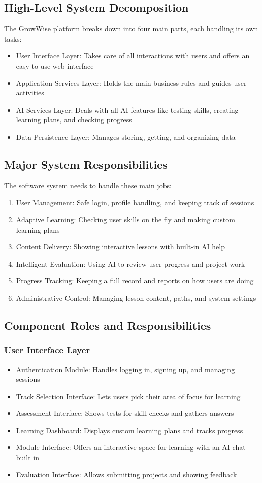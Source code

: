 \documentclass{FastFyp}
\begin{document}
\subsection{High-Level System Decomposition}
The GrowWise platform breaks down into four main parts, each handling its own tasks:
\begin{itemize}
    \item User Interface Layer: Takes care of all interactions with users and offers an easy-to-use web interface
    \item Application Services Layer: Holds the main business rules and guides user activities
    \item AI Services Layer: Deals with all AI features like testing skills, creating learning plans, and checking progress
    \item Data Persistence Layer: Manages storing, getting, and organizing data
\end{itemize}
\subsection{Major System Responsibilities}
The software system needs to handle these main jobs:
\begin{enumerate}
    \item User Management: Safe login, profile handling, and keeping track of sessions
    \item Adaptive Learning: Checking user skills on the fly and making custom learning plans
    \item Content Delivery: Showing interactive lessons with built-in AI help
    \item Intelligent Evaluation: Using AI to review user progress and project work
    \item Progress Tracking: Keeping a full record and reports on how users are doing
    \item Administrative Control: Managing lesson content, paths, and system settings
\end{enumerate}
\subsection{Component Roles and Responsibilities}
\subsubsection{User Interface Layer}
\begin{itemize}
    \item Authentication Module: Handles logging in, signing up, and managing sessions
    \item Track Selection Interface: Lets users pick their area of focus for learning
    \item Assessment Interface: Shows tests for skill checks and gathers answers
    \item Learning Dashboard: Displays custom learning plans and tracks progress
    \item Module Interface: Offers an interactive space for learning with an AI chat built in
    \item Evaluation Interface: Allows submitting projects and showing feedback
\end{itemize}
\end{document}
